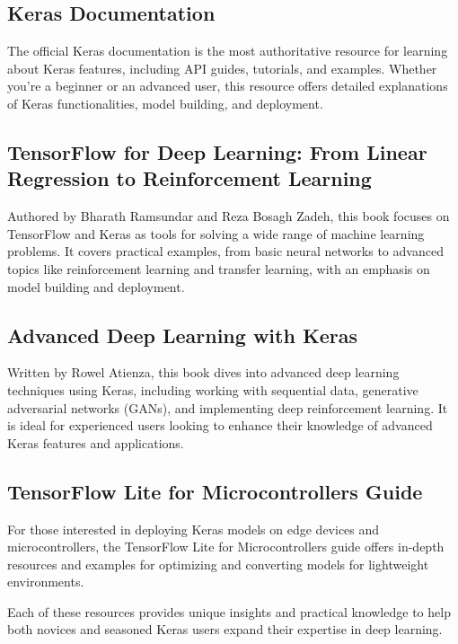 	\subsection{Keras Documentation}
	The official Keras documentation is the most authoritative resource for learning about Keras features, including API guides, tutorials, and examples. Whether you're a beginner or an advanced user, this resource offers detailed explanations of Keras functionalities, model building, and deployment. \cite{Keras:2024}
	
	\subsection{TensorFlow for Deep Learning: From Linear Regression to Reinforcement Learning}
	Authored by Bharath Ramsundar and Reza Bosagh Zadeh, this book focuses on TensorFlow and Keras as tools for solving a wide range of machine learning problems. It covers practical examples, from basic neural networks to advanced topics like reinforcement learning and transfer learning, with an emphasis on model building and deployment. \cite{Ramsundar:2018}
	
	\subsection{Advanced Deep Learning with Keras}
	Written by Rowel Atienza, this book dives into advanced deep learning techniques using Keras, including working with sequential data, generative adversarial networks (GANs), and implementing deep reinforcement learning. It is ideal for experienced users looking to enhance their knowledge of advanced Keras features and applications. \cite{Atienza:2020}
	
	\subsection{TensorFlow Lite for Microcontrollers Guide}
	For those interested in deploying Keras models on edge devices and microcontrollers, the TensorFlow Lite for Microcontrollers guide offers in-depth resources and examples for optimizing and converting models for lightweight environments.  \cite{Tensorflowlite:2024}
	
	Each of these resources provides unique insights and practical knowledge to help both novices and seasoned Keras users expand their expertise in deep learning.
	
	